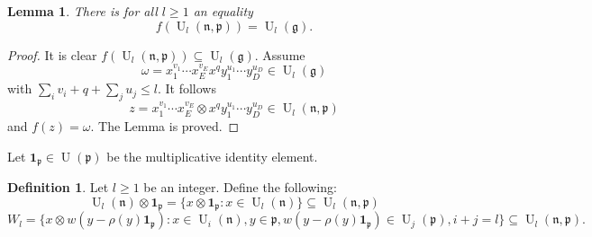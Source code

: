 \documentclass{amsart}
\theoremstyle{plain}
\newtheorem{lemma}[theorem]{Lemma}
\theoremstyle{definition}
\newtheorem{definition}[theorem]{Definition}
\theoremstyle{remark}
\numberwithin{equation}{theorem}
\begin{document}
\begin{lemma} There is for all $l\geq 1$ an equality
\[ f({\operatorname{U}}_l({\mathfrak{n}},{\mathfrak{p}}))={\operatorname{U}}_l({\mathfrak{g}}).\]
\end{lemma}
\begin{proof} It is clear $f({\operatorname{U}}_l({\mathfrak{n}},{\mathfrak{p}}))\subseteq
  {\operatorname{U}}_l({\mathfrak{g}})$. Assume
\[ \omega=x_1^{v_1}\cdots x_E^{v_E}x^qy_1^{u_1}\cdots y_D^{u_D}\in
{\operatorname{U}}_l({\mathfrak{g}})\]
with $\sum_i v_i+q+\sum_j u_j\leq l$.
It follows
\[ z= x_1^{v_1}\cdots x_E^{v_E}\otimes x^qy_1^{u_1}\cdots y_D^{u_D}\in
{\operatorname{U}}_l({\mathfrak{n}},{\mathfrak{p}}) \]
and $f(z)=\omega$. The Lemma is proved.
\end{proof}

Let ${\mathbf{1}_{\mathfrak{p}}} \in {\operatorname{U}}({\mathfrak{p}})$ be the multiplicative identity element. 

\begin{definition} Let $l\geq 1$ be an integer. Define the following:
\[ {\operatorname{U}}_l({\mathfrak{n}})\otimes {\mathbf{1}_{\mathfrak{p}}}=\{ x\otimes {\mathbf{1}_{\mathfrak{p}}}: x\in
{\operatorname{U}}_l({\mathfrak{n}})\} \subseteq {\operatorname{U}}_l({\mathfrak{n}},{\mathfrak{p}})\]
\[ W_l=\{x\otimes w(y-\rho(y){\mathbf{1}_{\mathfrak{p}}}): x\in {\operatorname{U}}_i({\mathfrak{n}}), y\in {\mathfrak{p}},
w(y-\rho(y){\mathbf{1}_{\mathfrak{p}}})\in {\operatorname{U}}_j({\mathfrak{p}}), i+j=l\}\subseteq {\operatorname{U}}_l({\mathfrak{n}},{\mathfrak{p}}).\]
\end{definition}
\end{document}
